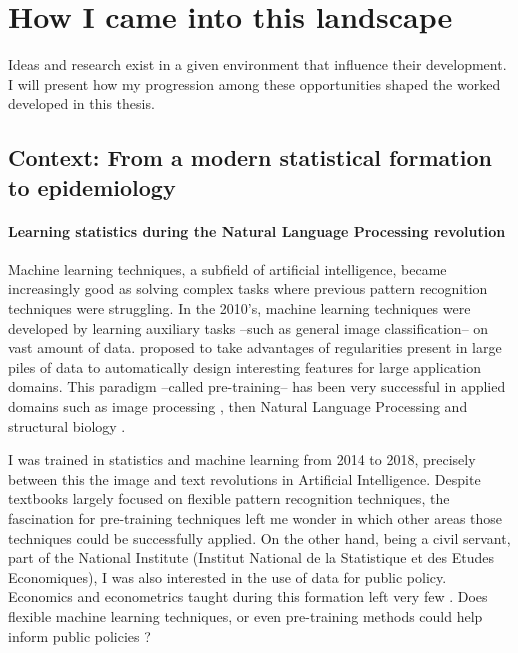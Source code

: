\documentclass[french,12pt,twoside,a4paper]{book}
\begin{document}
\minitoc
\section{How I came into this landscape}\label{sec:intro:landscape}

Ideas and research exist in a given environment that influence their development. I will
present how my progression among these opportunities shaped the worked developed
in this thesis.

\subsection{Context: From a modern statistical formation to epidemiology}\label{subsec:intro:context}

\paragraph{Learning statistics during the Natural Language Processing revolution}

Machine learning techniques, a subfield of artificial intelligence, became
increasingly good as solving complex tasks where previous pattern recognition
techniques were struggling. In the 2010's, machine learning techniques were
developed by learning auxiliary tasks --such as general image classification--
on vast amount of data. \cite{halevy2009unreasonable} proposed to take
advantages of regularities present in large piles of data to automatically
design interesting features for large application domains. This paradigm
--called pre-training-- has been very successful in applied domains such as
image processing \citep{krizhevsky2012imagenet}, then Natural Language
Processing \citep{devlin2018bert} and structural biology
\citep{jumper2021highly}.

I was trained in statistics and machine learning from 2014 to 2018, precisely
between this the image and text revolutions in Artificial Intelligence. Despite textbooks largely focused
on flexible pattern recognition techniques, the fascination for pre-training
techniques left me wonder in which other areas those techniques could be
successfully applied.
On the other hand, being a civil servant, part of the National Institute
(Institut National de la Statistique et des Etudes Economiques), I was also interested in the use of
data for public policy. Economics and econometrics taught during this formation
left very few . Does flexible machine learning techniques, or even pre-training
methods could help inform public policies ?
% 
\end{document}
